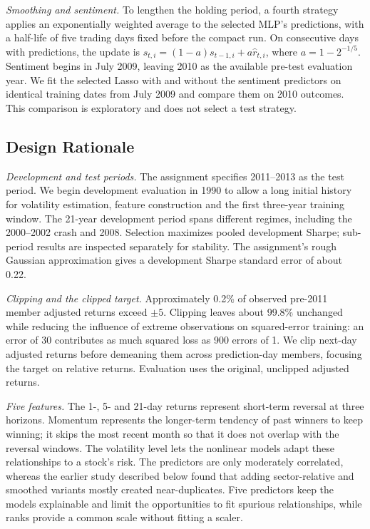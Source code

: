 \documentclass[conference]{IEEEtran}
\begin{document}
\textit{Smoothing and sentiment.} To lengthen the holding period, a fourth strategy applies an exponentially weighted average to the selected MLP's predictions, with a half-life of five trading days fixed before the compact run. On consecutive days with predictions, the update is
$s_{t,i}=(1-a)s_{t-1,i}+a\hat r_{t,i}$,
where $a=1-2^{-1/5}$. Sentiment begins in July 2009, leaving 2010 as the available pre-test evaluation year. We fit the selected Lasso with and without the sentiment predictors on identical training dates from July 2009 and compare them on 2010 outcomes. This comparison is exploratory and does not select a test strategy.

\subsection{Design Rationale}
\label{sec:t3_rationale}

\textit{Development and test periods.} The assignment specifies 2011--2013 as the test period. We begin development evaluation in 1990 to allow a long initial history for volatility estimation, feature construction and the first three-year training window. The 21-year development period spans different regimes, including the 2000--2002 crash and 2008. Selection maximizes pooled development Sharpe; sub-period results are inspected separately for stability. The assignment's rough Gaussian approximation gives a development Sharpe standard error of about 0.22.

\textit{Clipping and the clipped target.} Approximately 0.2\% of observed pre-2011 member adjusted returns exceed $\pm5$. Clipping leaves about 99.8\% unchanged while reducing the influence of extreme observations on squared-error training: an error of 30 contributes as much squared loss as 900 errors of 1. We clip next-day adjusted returns before demeaning them across prediction-day members, focusing the target on relative returns. Evaluation uses the original, unclipped adjusted returns.

\textit{Five features.} The 1-, 5- and 21-day returns represent short-term reversal at three horizons. Momentum represents the longer-term tendency of past winners to keep winning; it skips the most recent month so that it does not overlap with the reversal windows. The volatility level lets the nonlinear models adapt these relationships to a stock's risk. The predictors are only moderately correlated, whereas the earlier study described below found that adding sector-relative and smoothed variants mostly created near-duplicates. Five predictors keep the models explainable and limit the opportunities to fit spurious relationships, while ranks provide a common scale without fitting a scaler.
\end{document}
